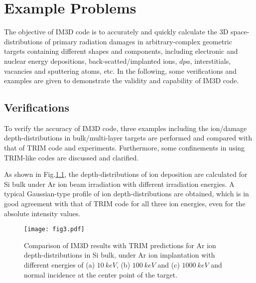 
\chapter{Example Problems}  %

\label{Chapter6}  %



The objective of IM3D code is to accurately and quickly calculate the 3D space-distributions of primary radiation damages in arbitrary-complex geometric targets containing different shapes and components, including electronic and nuclear energy depositions, back-scatted/implanted ions, $dpa$, interstitials, vacancies and sputtering atoms, etc. In the following, some verifications and examples are given to demonstrate the validity and capability of IM3D code.

\section{Verifications}

To verify the accuracy of IM3D code, three examples including the ion/damage depth-distributions in bulk/multi-layer targets are performed and compared with that of TRIM code and experiments. Furthermore, some confinements in using TRIM-like codes are discussed and clarified.

As shown in Fig.\ref{Fig.3}, the depth-distributions of ion deposition are calculated for Si bulk under Ar ion beam irradiation with different irradiation energies. A typical Gaussian-type profile of ion depth-distributions are obtained, which is in good agreement with that of TRIM code for all three ion energies, even for the absolute intensity values.

\begin{figure}[!ht]\centering
\texttt{[image: fig3.pdf]}
\caption{Comparison of IM3D results with TRIM predictions for Ar ion depth-distributions in Si bulk, under Ar ion
implantation with different energies of (a) $10~keV$, (b) $100~keV$ and (c) $1000~keV$ and normal incidence at the center point of the target.} \label{Fig.3}
\end{figure}

